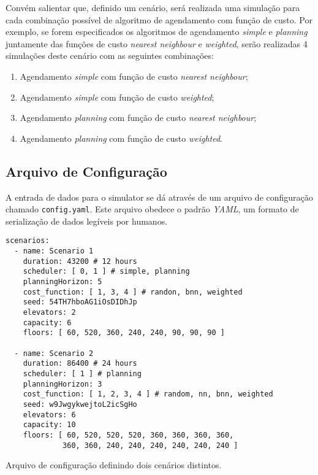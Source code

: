 Convém salientar que, definido um cenário, será realizada uma simulação para cada
combinação possível de algoritmo de agendamento com função de custo. Por
exemplo, se forem especificados os algoritmos de agendamento \textit{simple} e
\textit{planning} juntamente das funções de custo \textit{nearest neighbour} e
\textit{weighted}, serão realizadas 4 simulações deste cenário com as seguintes
combinações:

\begin{enumerate}
  \item Agendamento \textit{simple} com função de custo \textit{nearest neighbour};
  \item Agendamento \textit{simple} com função de custo \textit{weighted};
  \item Agendamento \textit{planning} com função de custo \textit{nearest neighbour};
  \item Agendamento \textit{planning} com função de custo \textit{weighted}.
\end{enumerate}

\subsection{\label{model:scenario:config}Arquivo de Configuração}

A entrada de dados para o simulator se dá através de um arquivo de configuração
chamado \texttt{config.yaml}. Este arquivo obedece o padrão \textit{YAML}, um
formato de serialização de dados legíveis por humanos.

\begin{algorithm}[htb]
  \centering
    \begin{verbatim}
scenarios:
  - name: Scenario 1
    duration: 43200 # 12 hours
    scheduler: [ 0, 1 ] # simple, planning
    planningHorizon: 5
    cost_function: [ 1, 3, 4 ] # randon, bnn, weighted
    seed: 54TH7hboAG1iOsDIDhJp
    elevators: 2
    capacity: 6
    floors: [ 60, 520, 360, 240, 240, 90, 90, 90 ]

  - name: Scenario 2
    duration: 86400 # 24 hours
    scheduler: [ 1 ] # planning
    planningHorizon: 3
    cost_function: [ 1, 2, 3, 4 ] # random, nn, bnn, weighted
    seed: w9JwgykwejtoL2icSgHo
    elevators: 6
    capacity: 10
    floors: [ 60, 520, 520, 520, 360, 360, 360, 360,
             360, 360, 240, 240, 240, 240, 240, 240 ]
    \end{verbatim}
  \caption{Arquivo de configuração definindo dois cenários distintos.}
  \label{alg:config}
\end{algorithm}


